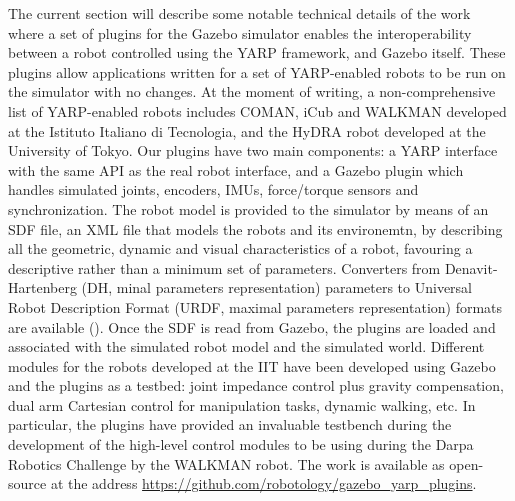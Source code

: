 The current section will describe some notable technical details of the work~\cite{hoffman2014yarp} where a set of plugins for the Gazebo simulator  enables the interoperability between a robot controlled using the YARP framework, and Gazebo itself. These plugins allow applications written for a set of YARP-enabled robots to be run on the simulator with no changes. At the moment of writing, a non-comprehensive list of YARP-enabled robots includes COMAN, iCub and WALKMAN developed at the Istituto Italiano di Tecnologia, and the HyDRA robot developed at the University of Tokyo. Our plugins have two main components: a YARP interface with the same API as the real robot interface, and a Gazebo plugin which handles simulated joints, encoders, IMUs, force/torque sensors and synchronization. The robot model is provided to the simulator by means of an SDF file, an XML file that models the robots and its environemtn, by describing all the geometric, dynamic and visual characteristics of a robot, favouring a descriptive rather than a minimum set of parameters. Converters from Denavit-Hartenberg (DH, minal parameters representation) parameters to Universal Robot Description Format (URDF, maximal parameters representation) formats are available ().
Once the SDF is read from Gazebo, the plugins are loaded and associated with the simulated robot model and the simulated world. Different modules for the robots developed at the IIT have been developed using Gazebo and the plugins as a testbed: joint impedance control plus gravity compensation, dual arm Cartesian control for manipulation tasks, dynamic walking, etc. In particular, the plugins have provided an invaluable testbench during the development of the high-level control modules to be using during the Darpa Robotics Challenge by the WALKMAN robot.
The work is available as open-source at the address \url{https://github.com/robotology/gazebo_yarp_plugins}.

